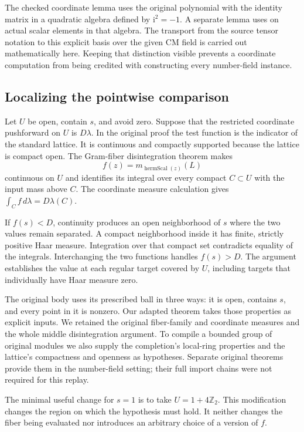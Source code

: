 \documentclass[12pt,letterpaper]{article}
\newcommand{\code}[1]{\texttt{\detokenize{#1}}}
\begin{document}
The checked coordinate lemma uses the original polynomial \code{hform} with the identity matrix in a quadratic algebra defined by \(\mathrm i^2=-1\). A separate lemma uses \code{Algebra.trace} on actual scalar elements in that algebra. The transport from the source tensor notation to this explicit basis over the given CM field is carried out mathematically here. Keeping that distinction visible prevents a coordinate computation from being credited with constructing every number-field instance.

\clearpage\subsection{Localizing the pointwise comparison}
Let \(U\) be open, contain \(s\), and avoid zero. Suppose that the restricted coordinate pushforward on \(U\) is \(D\lambda\). In the original proof the test function is the indicator of the standard lattice. It is continuous and compactly supported because the lattice is compact open. The Gram-fiber disintegration theorem makes
\[
              f(z)=m_{\operatorname{hermScal}(z)}(L)
\]
continuous on \(U\) and identifies its integral over every compact \(C\subset U\) with the input mass above \(C\). The coordinate measure calculation gives \(\int_C f\,d\lambda=D\lambda(C)\).

If \(f(s)<D\), continuity produces an open neighborhood of \(s\) where the two values remain separated. A compact neighborhood inside it has finite, strictly positive Haar measure. Integration over that compact set contradicts equality of the integrals. Interchanging the two functions handles \(f(s)>D\). The argument establishes the value at each regular target covered by \(U\), including targets that individually have Haar measure zero.

The original body uses its prescribed ball in three ways: it is open, contains \(s\), and every point in it is nonzero. Our adapted theorem takes those properties as explicit inputs. We retained the original fiber-family and coordinate measures and the whole middle disintegration argument. To compile a bounded group of original modules we also supply the completion's local-ring properties and the lattice's compactness and openness as hypotheses. Separate original theorems provide them in the number-field setting; their full import chains were not required for this replay.

The minimal useful change for \(s=1\) is to take \(U=1+4\mathbb Z_2\). This modification changes the region on which the hypothesis must hold. It neither changes the fiber being evaluated nor introduces an arbitrary choice of a version of \(f\).
\end{document}
